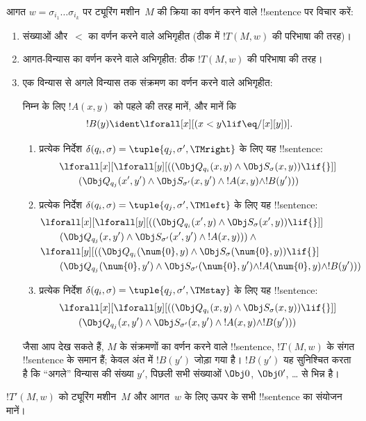 \documentclass[../../../include/open-logic-section]{subfiles}
\begin{document}
आगत $w = \sigma_{i_1}\dots\sigma_{i_k}$ पर ट्यूरिंग मशीन~$M$ की
क्रिया का वर्णन करने वाले !!{sentence} पर विचार करें:
\begin{enumerate}
\item संख्याओं और~$<$ का वर्णन करने वाले अभिगृहीत (ठीक
   में $!T(M,w)$ की परिभाषा की तरह)।
\item आगत-विन्यास का वर्णन करने वाले अभिगृहीत: ठीक $!T(M,w)$ की
  परिभाषा की तरह।
\item एक विन्यास से अगले विन्यास तक संक्रमण का वर्णन करने वाले
  अभिगृहीत:

निम्न के लिए $!A(x, y)$ को पहले की तरह मानें, और मानें कि
\[
  !B(y) \ident \lforall[x][(x < y \lif \eq/[x][y])].
\]
\begin{enumerate}
\item {} प्रत्येक निर्देश
  $\delta(q_i, \sigma) = \tuple{q_j, \sigma', \TMright}$ के लिए
  यह !!{sentence}:
\begin{align*}
& \lforall[x][\lforall[y][(
   (\Obj Q_{q_i}(x, y) \land \Obj S_{\sigma}(x, y)) \lif {}]] \\
&\qquad   (\Obj Q_{q_j}(x', y') \land \Obj S_{\sigma'}(x, y') \land
{}!A(x, y) \land !B(y')))
\end{align*}
\item {} प्रत्येक निर्देश
  $\delta(q_i, \sigma) = \tuple{q_j, \sigma', \TMleft}$ के लिए
  यह !!{sentence}:
\begin{align*}
& \lforall[x][\lforall[y][
    ((\Obj Q_{q_i}(x', y) \land \Obj S_{\sigma}(x', y)) \lif {}]]\\
& \qquad   (\Obj Q_{q_j}(x, y') \land \Obj S_{\sigma'}(x', y') \land
{}!A(x, y))) \land {}\\
& \lforall[y][((\Obj Q_{q_i}(\num{0}, y) \land \Obj S_{\sigma}(\num{0},
    y)) \lif {}]\\
& \qquad (\Obj Q_{q_j}(\num{0}, y') \land \Obj S_{\sigma'}(\num{0},
  y') \land !A(\num{0}, y) \land !B(y')))
\end{align*}
\item {} प्रत्येक निर्देश
  $\delta(q_i, \sigma) = \tuple{q_j, \sigma', \TMstay}$ के लिए
  यह !!{sentence}:
\begin{align*}
& \lforall[x][\lforall[y][(
   (\Obj Q_{q_i}(x, y) \land \Obj S_{\sigma}(x, y)) \lif {}]] \\
&\qquad (\Obj Q_{q_j}(x, y') \land \Obj S_{\sigma'}(x, y') \land
{}!A(x, y) \land !B(y')))
\end{align*}
\end{enumerate}
जैसा आप देख सकते हैं, $M$ के संक्रमणों का वर्णन करने वाले !!{sentence},
$!T(M,w)$ के संगत !!{sentence} के समान हैं; केवल अंत में $!B(y')$
जोड़ा गया है। $!B(y')$ यह सुनिश्चित करता है कि “अगले” विन्यास की
संख्या $y'$, पिछली सभी संख्याओं $\Obj 0$, $\Obj 0'$, \dots{} से भिन्न
है।
\end{enumerate}
$!T'(M, w)$ को ट्यूरिंग मशीन~$M$ और आगत~$w$ के लिए ऊपर के सभी
!!{sentence} का संयोजन मानें।
\end{document}
